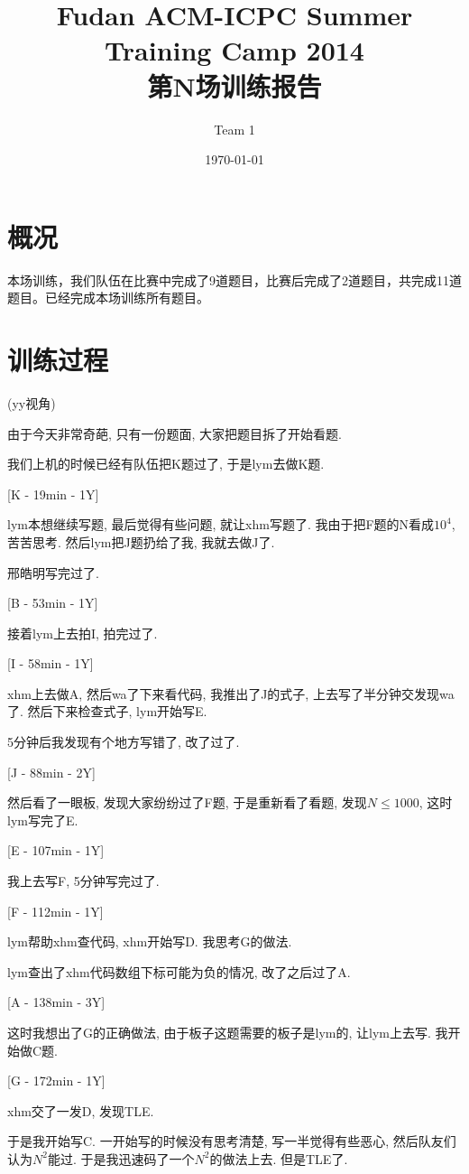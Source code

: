 \documentclass[a4paper, 11pt, nofonts, nocap, fancyhdr]{ctexart}
\title{Fudan ACM-ICPC Summer Training Camp 2014\\第N场训练报告}
\author{Team 1}
\date{\today}
\begin{document}
\maketitle

\section{概况}

本场训练，我们队伍在比赛中完成了9道题目，比赛后完成了2道题目，共完成11道题目。已经完成本场训练所有题目。


\section{训练过程}

(yy视角)

由于今天非常奇葩, 只有一份题面, 大家把题目拆了开始看题.

我们上机的时候已经有队伍把K题过了, 于是lym去做K题.

[K - 19min - 1Y]

lym本想继续写题, 最后觉得有些问题, 就让xhm写题了. 我由于把F题的N看成$10^4$, 苦苦思考. 然后lym把J题扔给了我, 我就去做J了.

邢皓明写完过了.

[B - 53min - 1Y]

接着lym上去拍I, 拍完过了.

[I - 58min - 1Y]

xhm上去做A, 然后wa了下来看代码, 我推出了J的式子, 上去写了半分钟交发现wa了. 然后下来检查式子, lym开始写E.

5分钟后我发现有个地方写错了, 改了过了.

[J - 88min - 2Y]

然后看了一眼板, 发现大家纷纷过了F题, 于是重新看了看题, 发现$N \leq 1000$, 这时lym写完了E.

[E - 107min - 1Y]

我上去写F, 5分钟写完过了.

[F - 112min - 1Y]

lym帮助xhm查代码, xhm开始写D. 我思考G的做法.

lym查出了xhm代码数组下标可能为负的情况, 改了之后过了A.

[A - 138min - 3Y]

这时我想出了G的正确做法, 由于板子这题需要的板子是lym的, 让lym上去写. 我开始做C题.

[G - 172min - 1Y]

xhm交了一发D, 发现TLE.

于是我开始写C. 一开始写的时候没有思考清楚, 写一半觉得有些恶心, 然后队友们认为$N^2$能过. 于是我迅速码了一个$N^2$的做法上去. 但是TLE了.
\end{document}
